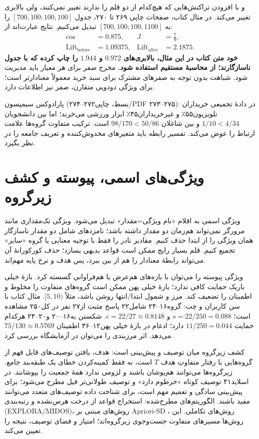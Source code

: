 \documentclass[12pt,a4paper,oneside]{report}
\newcounter{ex}[chapter]
\begin{document}
 و  با افزودن تراکنش‌هایی که هیچ‌کدام از دو قلم را ندارند تغییر نمی‌کنند، ولی بالابری تغییر می‌کند. در مثال کتاب، صفحات چاپی ۲۶۹ تا ۲۷۰، جدول $[700,100;100,100]$ را به $[700,100;100,1100]$ تبدیل می‌کنیم. نتایج عبارت‌اند از:
\begin{align*}
\operatorname{cos}&=0.875,& J&=\frac79,\\
\operatorname{Lift}_{\mathrm{before}}&=1.09375,&
\operatorname{Lift}_{\mathrm{after}}&=2.1875.
\end{align*}
\textbf{خود متن کتاب در این مثال، بالابری‌های $0.972$ و $1.944$ را چاپ کرده که با جدول ناسازگارند؛ از محاسبهٔ مستقیم استفاده شود.} مخرج صفر برای هر معیار باید مدیریت شود. شباهت بدون توجه به صفرهای مشترک برای سبد خرید معمولاً معنادارتر است؛ برای ویژگی دودویی متقارن، صفر نیز اطلاعات دارد.

پارادوکس سیمپسون (بسط، چاپی۲۷۲--۲۷۴/PDF ۲۷۳--۲۷۵): در دادهٔ تجمیعی خریداران تلویزیون۵۵٪ و غیرخریداران۴۵٪ ابزار ورزشی می‌خرند؛ اما بین دانشجویان $1/10<4/34$ و بین شاغلان $98/170<50/86$ است. ترکیب متفاوت گروه‌ها علامت ارتباط را عوض می‌کند. تفسیر رابطه باید متغیرهای مخدوش‌کننده و تعریف جامعه را در نظر بگیرد.

\section{ویژگی‌های اسمی، پیوسته و کشف زیرگروه}

ویژگی اسمی به اقلام «نام ویژگی=مقدار» تبدیل می‌شود. ویژگی تک‌مقداری مانند مرورگر نمی‌تواند هم‌زمان دو مقدار داشته باشد؛ نامزدهای شامل دو مقدار ناسازگار همان ویژگی را از ابتدا حذف کنیم. مقادیر نادر را فقط با توجیه معنایی یا گروه «سایر» تجمیع کنیم. قلم بسیار رایج ممکن است قواعد بدیهی بسازد؛ حذف کورکورانهٔ آن می‌تواند رابطهٔ معنادار را هم از بین ببرد، پس هدف و نرخ پایه مهم‌اند.

ویژگی پیوسته را می‌توان با بازه‌های هم‌عرض یا هم‌فراوانی گسسته کرد. بازهٔ خیلی باریک حمایت کافی ندارد؛ بازهٔ خیلی پهن ممکن است گروه‌های متفاوت را مخلوط و اطمینان را تضعیف کند. مرز و شمول ابتدا/انتها روشن باشد، مثلاً $[5,10)$. مثال کتاب با سن کاربران و چت: گروه۱۶--۲۴ شامل۲۲ پاسخ مثبت از۲۷ نفر در کل۲۵۰ مشاهده است؛ $s=22/250=0.088$ و $c=22/27\approx0.8148$. شکستن به۱۶--۲۰ و۲۰--۲۴ هرکدام حمایت $11/250=0.044$ دارد؛ ادغام در بازهٔ خیلی پهن۱۲--۳۶ اطمینان $75/130\approx0.5769$ می‌دهد. اثر مرزبندی را می‌توان در آزمایشگاه بررسی کرد.

کشف زیرگروه میان توصیف و پیش‌بینی است: هدف، یافتن توصیف‌های قابل فهم از گروه‌هایی با رفتار متفاوتِ هدف $T$ است، نه فقط کمینه‌کردن خطای یک طبقه‌بند جامع. زیرگروه‌ها می‌توانند هم‌پوشان باشند و لزومی ندارد همهٔ جمعیت را بپوشانند. در اسلاید۴۱ توصیف کوتاه «خرطوم دارد» و توصیف طولانی‌تر فیل مطرح می‌شود؛ برای پیش‌بینی سادگی و تعمیم مهم است، برای شناخت داده توصیف‌های متعدد می‌توانند مفید باشند. الگوریتم‌های مطرح‌شده: استخراج قواعد از درخت هرس‌نشده و رتبه‌بندی (EXPLORA/MIDOS)، روش‌های مبتنی بر Apriori-SD ، روش‌های تکاملی. این روش‌ها مسیرهای متفاوت جست‌وجوی زیرگروه‌اند؛ امتیاز و فضای توصیف، نتیجه را تعیین می‌کند.
\end{document}
